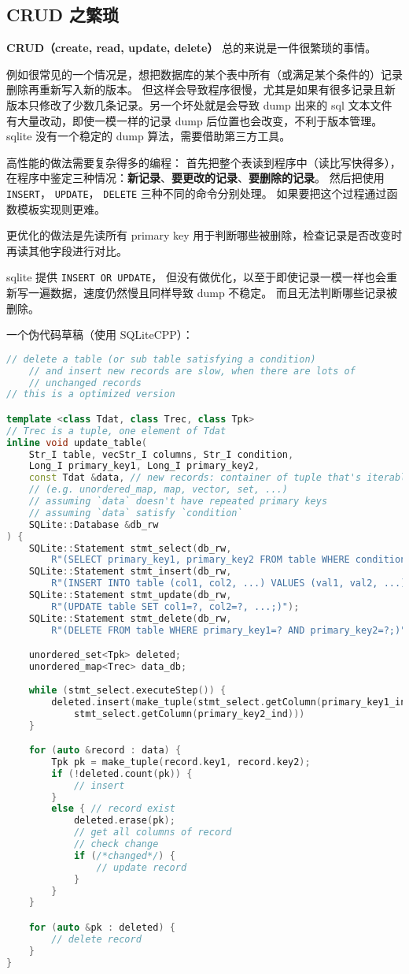 \subsection{CRUD 之繁琐}\label{sub_SQLite_1}
\textbf{CRUD（create, read, update, delete）} 总的来说是一件很繁琐的事情。

例如很常见的一个情况是，想把数据库的某个表中所有（或满足某个条件的）记录删除再重新写入新的版本。 但这样会导致程序很慢，尤其是如果有很多记录且新版本只修改了少数几条记录。另一个坏处就是会导致 dump 出来的 sql 文本文件有大量改动，即使一模一样的记录 dump 后位置也会改变，不利于版本管理。 sqlite 没有一个稳定的 dump 算法，需要借助第三方工具。

高性能的做法需要复杂得多的编程： 首先把整个表读到程序中（读比写快得多）， 在程序中鉴定三种情况：\textbf{新记录}、\textbf{要更改的记录}、\textbf{要删除的记录}。 然后把使用 \verb`INSERT`， \verb`UPDATE`， \verb`DELETE` 三种不同的命令分别处理。 如果要把这个过程通过函数模板实现则更难。

更优化的做法是先读所有 primary key 用于判断哪些被删除，检查记录是否改变时再读其他字段进行对比。

sqlite 提供 \verb`INSERT OR UPDATE`， 但没有做优化，以至于即使记录一模一样也会重新写一遍数据，速度仍然慢且同样导致 dump 不稳定。 而且无法判断哪些记录被删除。

一个伪代码草稿（使用 SQLiteCPP）：
\begin{lstlisting}[language=cpp]
// delete a table (or sub table satisfying a condition)
    // and insert new records are slow, when there are lots of
	// unchanged records
// this is a optimized version

template <class Tdat, class Trec, class Tpk>
// Trec is a tuple, one element of Tdat
inline void update_table(
	Str_I table, vecStr_I columns, Str_I condition,
	Long_I primary_key1, Long_I primary_key2,
	const Tdat &data, // new records: container of tuple that's iterable
	// (e.g. unordered_map, map, vector, set, ...)
	// assuming `data` doesn't have repeated primary keys
	// assuming `data` satisfy `condition`
	SQLite::Database &db_rw
) {
	SQLite::Statement stmt_select(db_rw,
		R"(SELECT primary_key1, primary_key2 FROM table WHERE condition;)");
	SQLite::Statement stmt_insert(db_rw,
		R"(INSERT INTO table (col1, col2, ...) VALUES (val1, val2, ...);)");
	SQLite::Statement stmt_update(db_rw,
	    R"(UPDATE table SET col1=?, col2=?, ...;)");
	SQLite::Statement stmt_delete(db_rw,
	    R"(DELETE FROM table WHERE primary_key1=? AND primary_key2=?;)");

	unordered_set<Tpk> deleted;
	unordered_map<Trec> data_db;
	
	while (stmt_select.executeStep()) {
		deleted.insert(make_tuple(stmt_select.getColumn(primary_key1_ind), 
			stmt_select.getColumn(primary_key2_ind)))
	}

	for (auto &record : data) {
		Tpk pk = make_tuple(record.key1, record.key2);
		if (!deleted.count(pk)) {
			// insert
		}
		else { // record exist
			deleted.erase(pk);
			// get all columns of record
			// check change
			if (/*changed*/) {
				// update record
			}
		}
	}

	for (auto &pk : deleted) {
		// delete record
	}
}
\end{lstlisting}
